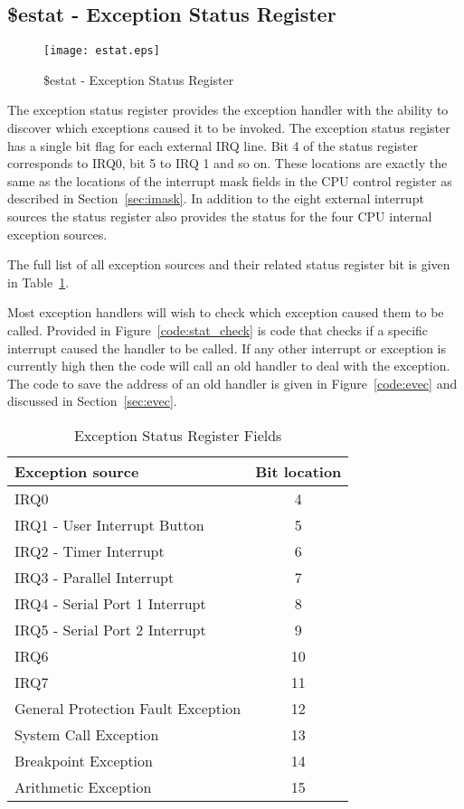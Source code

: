 \subsection{\$estat - Exception Status Register}

\begin{figure}[h]
\begin{center}
\texttt{[image: estat.eps]}
\caption{\$estat - Exception Status Register}
\label{estat_pic}
\end{center}
\end{figure}

The exception status register provides the exception handler with the
ability to discover which exceptions caused it to be invoked. The
exception status register has a single bit flag for each external IRQ
line. Bit 4 of the status register corresponds to IRQ0, bit 5 to IRQ 1
and so on. These locations are exactly the same as the locations of
the interrupt mask fields in the CPU control register as described in
Section~\ref{sec:imask}. In addition to the eight external interrupt
sources the status register also provides the status for the four CPU
internal exception sources. 

The full list of all exception sources and their related status
register bit is given in Table~\ref{table:sta_loc}.

Most exception handlers will wish to check which exception caused them
to be called. Provided in Figure~\ref{code:stat_check} is code that
checks if a specific interrupt caused the handler to be called. If any
other interrupt or exception is currently high then the code will call
an old handler to deal with the exception. The code to save the
address of an old handler is given in Figure~\ref{code:evec} and
discussed in Section~\ref{sec:evec}.

\begin{table}[h]
\begin{center}
\begin{tabular}{|l|c|}
\hline
\textbf{Exception source} & \textbf{Bit location} \\
\hline
IRQ0 & 4 \\
\hline
IRQ1 - User Interrupt Button & 5 \\
\hline
IRQ2 - Timer Interrupt & 6 \\
\hline
IRQ3 - Parallel Interrupt & 7 \\
\hline
IRQ4 - Serial Port 1 Interrupt & 8 \\
\hline
IRQ5 - Serial Port 2 Interrupt & 9 \\
\hline
IRQ6 & 10 \\
\hline
IRQ7 & 11 \\
\hline
General Protection Fault Exception & 12 \\
\hline
System Call Exception & 13 \\
\hline
Breakpoint Exception & 14 \\
\hline
Arithmetic Exception & 15 \\
\hline
\end{tabular}
\caption{Exception Status Register Fields}
\label{table:sta_loc}
\end{center}
\end{table}

